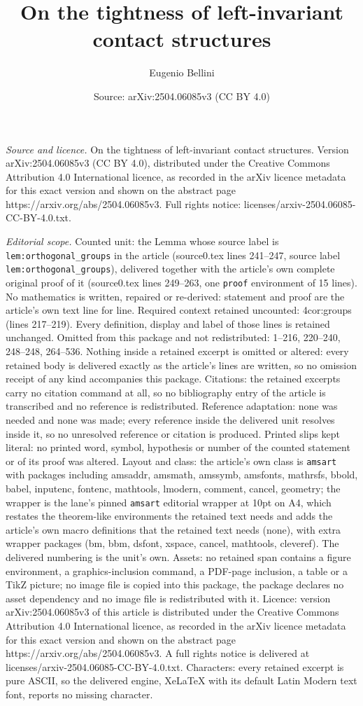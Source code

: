 \documentclass[10pt,a4paper]{amsart}
\title[On the tightness of left-invariant contact structures]{On the tightness of left-invariant contact structures}
\author{Eugenio Bellini}
\date{Source: arXiv:2504.06085v3 (CC BY 4.0)}
\begin{document}
\maketitle

\noindent\emph{Source and licence.} On the tightness of left-invariant contact structures. Version arXiv:2504.06085v3 (CC BY 4.0), distributed under the Creative Commons Attribution 4.0 International licence, as recorded in the arXiv licence metadata for this exact version and shown on the abstract page https://arxiv.org/abs/2504.06085v3. Full rights notice: licenses/arxiv-2504.06085-CC-BY-4.0.txt.\par\smallskip

\noindent\textit{Editorial scope.} Counted unit: the Lemma whose source label is \texttt{lem:orthogonal\_groups} in the article (source0.tex lines 241--247, source label \texttt{lem:orthogonal\_groups}), delivered together with the article's own complete original proof of it (source0.tex lines 249--263, one \texttt{proof} environment of 15 lines). No mathematics is written, repaired or re-derived: statement and proof are the article's own text line for line. Required context retained uncounted: 4cor:groups (lines 217--219). Every definition, display and label of those lines is retained unchanged. Omitted from this package and not redistributed: 1--216, 220--240, 248--248, 264--536. Nothing inside a retained excerpt is omitted or altered: every retained body is delivered exactly as the article's lines are written, so no omission receipt of any kind accompanies this package. Citations: the retained excerpts carry no citation command at all, so no bibliography entry of the article is transcribed and no reference is redistributed. Reference adaptation: none was needed and none was made; every reference inside the delivered unit resolves inside it, so no unresolved reference or citation is produced. Printed slips kept literal: no printed word, symbol, hypothesis or number of the counted statement or of its proof was altered. Layout and class: the article's own class is \texttt{amsart} with packages including amsaddr, amsmath, amssymb, amsfonts, mathrsfs, bbold, babel, inputenc, fontenc, mathtools, lmodern, comment, cancel, geometry; the wrapper is the lane's pinned \texttt{amsart} editorial wrapper at 10pt on A4, which restates the theorem-like environments the retained text needs and adds the article's own macro definitions that the retained text needs (none), with extra wrapper packages (bm, bbm, dsfont, xspace, cancel, mathtools, cleveref). The delivered numbering is the unit's own. Assets: no retained span contains a figure environment, a graphics-inclusion command, a PDF-page inclusion, a table or a TikZ picture; no image file is copied into this package, the package declares no asset dependency and no image file is redistributed with it. Licence: version arXiv:2504.06085v3 of this article is distributed under the Creative Commons Attribution 4.0 International licence, as recorded in the arXiv licence metadata for this exact version and shown on the abstract page https://arxiv.org/abs/2504.06085v3. A full rights notice is delivered at licenses/arxiv-2504.06085-CC-BY-4.0.txt. Characters: every retained excerpt is pure ASCII, so the delivered engine, XeLaTeX with its default Latin Modern text font, reports no missing character.
\end{document}
